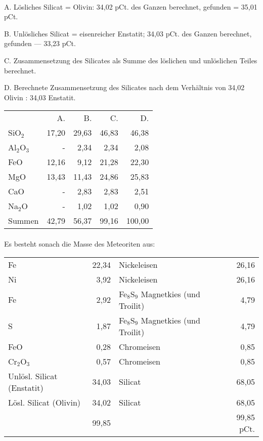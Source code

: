 \documentclass[a4paper, 11pt, oneside]{article}
\begin{document}
\paragraph{}
A. Lösliches Silicat = Olivin: 34,02 pCt. des Ganzen berechnet, gefunden = 35,01 pCt.

B. Unlösliches Silicat = eisenreicher Enstatit; 34,03 pCt. des Ganzen berechnet, gefunden --- 33,23 pCt.

C. Zusammensetzung des Silicates als Summe des löslichen und unlöslichen Teiles berechnet.

D. Berechnete Zusammensetzung des Silicates nach dem Verhältnis von 34,02 Olivin : 34,03 Enstatit.
\normalsize
\begin{center}
\begin{tabular}{ l r r r r }
     & A. & B. & C. & D.\\
    SiO$_{2}$ & 17,20 & 29,63 & 46,83 & 46,38\\
    Al$_{2}$O$_{3}$ & - & 2,34 & 2,34 & 2,08\\
    FeO & 12,16 & 9,12 & 21,28 & 22,30\\
    MgO & 13,43 & 11,43 & 24,86 & 25,83\\
    CaO & - & 2,83 & 2,83 & 2,51\\
    Na$_{2}$O & - & 1,02 & 1,02 & 0,90\\
    Summen & 42,79 & 56,37 & 99,16 & 100,00\\
\end{tabular}
\end{center}
\clearpage
\LARGE
\paragraph{}
Es besteht sonach die Masse des Meteoriten aus:
\normalsize
\begin{center}
\begin{tabular}{ p{25mm} r p{35mm} r }
    Fe & 22,34 & Nickeleisen & 26,16\\
    Ni & 3,92 & Nickeleisen & 26,16\\
    Fe & 2,92& Fe$_{8}$S$_{9}$ Magnetkies (und Troilit) & 4,79\\
    S & 1,87& Fe$_{8}$S$_{9}$ Magnetkies (und Troilit) & 4,79\\
    FeO & 0,28 & Chromeisen & 0,85\\
    Cr$_{2}$O$_{3}$ & 0,57 & Chromeisen & 0,85\\
    Unlösl. Silicat (Enstatit) & 34,03 & Silicat & 68,05\\
    Lösl. Silicat (Olivin) & 34,02 & Silicat & 68,05\\
     & 99,85 & & 99,85 pCt.\\
\end{tabular}
\end{center}
\LARGE
\end{document}
